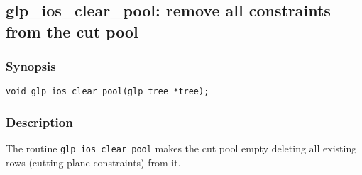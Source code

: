 \subsection{glp\_ios\_clear\_pool: remove all constraints from the cut
pool}

\subsubsection*{Synopsis}

\begin{verbatim}
void glp_ios_clear_pool(glp_tree *tree);
\end{verbatim}

\subsubsection*{Description}

The routine \verb|glp_ios_clear_pool| makes the cut pool empty deleting
all existing rows (cutting plane constraints) from it.

